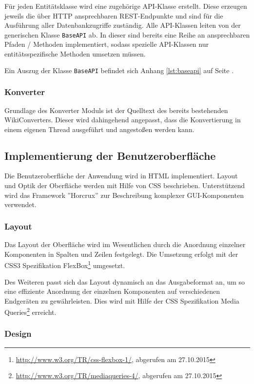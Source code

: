 \documentclass[12pt, xcolor=dvipsnames]{scrartcl}
\begin{document}
Für jeden Entitätsklasse wird eine zugehörige API-Klasse erstellt. Diese erzeugen jeweils die über HTTP ansprechbaren REST-Endpunkte und sind für die Ausführung aller Datenbankzugriffe zuständig. Alle API-Klassen leiten von der generischen Klasse \texttt{BaseAPI} ab. In dieser sind bereits eine Reihe an ansprechbaren Pfaden / Methoden implementiert, sodass spezielle API-Klassen nur entitätsspezifische Methoden umsetzen müssen.

Ein Auszug der Klasse \texttt{BaseAPI} befindet sich Anhang \ref{lst:baseapi} auf Seite \pageref{lst:baseapi}.

\subsubsection*{Konverter}

Grundlage des Konverter Moduls ist der Quelltext des bereits bestehenden WikiConverters. Dieser wird dahingehend angepasst, dass die Konvertierung in einem eigenen Thread ausgeführt und angestoßen werden kann.

\subsection{Implementierung der Benutzeroberfläche}

Die Benutzeroberfläche der Anwendung wird in HTML implementiert.
Layout und Optik der Oberfläche werden mit Hilfe von CSS beschrieben. 
Unterstützend wird das Framework ''Horcrux'' zur Beschreibung komplexer GUI-Komponenten verwendet.

\subsubsection*{Layout}

Das Layout der Oberfläche wird im Wesentlichen durch die Anordnung einzelner Komponenten in Spalten und Zeilen festgelegt.
Die Umsetzung erfolgt mit der CSS3 Spezifikation
FlexBox\footnote{\url{http://www.w3.org/TR/css-flexbox-1/}, abgerufen am 27.10.2015} umgesetzt.

Des Weiteren passt sich das Layout dynamisch an das Ausgabeformat an, um so eine effiziente Anordnung der einzelnen Komponenten auf verschiedenen Endgeräten zu gewährleisten. Dies wird mit Hilfe der CSS Spezifikation
Media Queries\footnote{\url{http://www.w3.org/TR/mediaqueries-4/}, abgerufen am 27.10.2015} erreicht.

\subsubsection*{Design}
\end{document}
